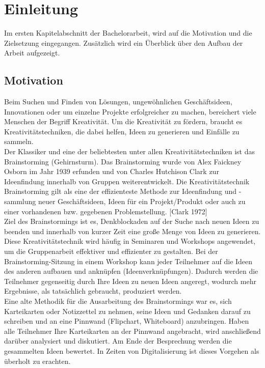 \chapter{Einleitung}
\label{sec:einleitung}
Im ersten Kapitelabschnitt der Bachelorarbeit, wird auf die Motivation und die Zielsetzung eingegangen. Zusätzlich wird ein Überblick über den Aufbau der Arbeit aufgezeigt.

\section{Motivation}
\label{sec:motivation}
Beim Suchen und Finden von Lösungen, ungewöhnlichen Geschäftsideen, Innovationen oder um einzelne Projekte erfolgreicher zu machen, bereichert viele Menschen der Begriff Kreativität. Um die Kreativität zu fördern, braucht es Kreativitätstechniken, die dabei helfen, Ideen zu generieren und Einfälle zu sammeln.
\\

Der Klassiker und eine der beliebtesten unter allen Kreativitätstechniken ist das Brainstorming (Gehirnsturm). Das Brainstorming wurde von Alex Faickney Osborn im Jahr 1939 erfunden und von Charles Hutchison Clark zur Ideenfindung innerhalb von Gruppen weiterentwickelt. Die Kreativitätstechnik Brainstorming gilt als eine der effizienteste Methode zur Ideenfindung und -sammlung neuer Geschäftsideen, Ideen für ein Projekt/Produkt oder auch zu einer vorhandenen bzw. gegebenen Problemstellung. [Clark 1972] 
\\

Ziel des Brainstormings ist es, Denkblockaden auf der Suche nach neuen Ideen zu beenden und innerhalb von kurzer Zeit eine große Menge von Ideen zu generieren. Diese Kreativitätstechnik wird häufig in Seminaren und Workshops angewendet, um die Gruppenarbeit effektiver und effizienter zu gestalten. Bei der Brainstorming-Sitzung in einem Workshop kann jeder Teilnehmer auf die Ideen des anderen aufbauen und anknüpfen (Ideenverknüpfungen). Dadurch werden die Teilnehmer gegenseitig durch Ihre Ideen zu neuen Ideen angeregt, wodurch mehr Ergebnisse, als tatsächlich gebraucht, produziert werden. 
\\

Eine alte Methodik für die Ausarbeitung des Brainstormings war es, sich Karteikarten oder Notizzettel zu nehmen, seine Ideen und Gedanken darauf zu schreiben und an eine Pinnwand (Flipchart, Whiteboard) anzubringen. Haben alle Teilnehmer Ihre Karteikarten an der Pinnwand angebracht, wird anschließend darüber analysiert und diskutiert. Am Ende der Besprechung werden die gesammelten Ideen bewertet. In Zeiten von Digitalisierung ist dieses Vorgehen als überholt zu erachten.

